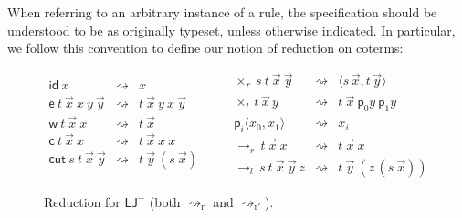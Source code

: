\documentclass[10pt,a4paper]{amsart}
\theoremstyle{plain}
\theoremstyle{definition}
\newcommand{\anupam}[1]{\todo[color=green]{A: #1}}
\renewcommand{\todo}[1]{}
\renewcommand{\anupam}[1]{}
\theoremstyle{plain}
\theoremstyle{definition} %
\newcommand{\sem}[1]{\llbracket {#1} \rrbracket}
\newcommand{\nat}{\mathit{N}}
\newcommand{\N}{\nat} %
\newcommand{\unit}{1}
\newcommand{\arrow}{\to}
\newcommand{\imp}{\arrow} %
\newcommand{\inj}{\mathsf{in}}
\newcommand{\id}{\mathsf{id}}
\newcommand{\ax}{\id}
\newcommand{\ex}{\mathsf{e}}
\newcommand{\cut}{\mathsf{cut}}
\newcommand{\wk}{\mathsf{w}}
\newcommand{\contr}{\mathsf{c}}
\newcommand{\pair}[2]{\langle #1,#2\rangle}
\newcommand{\lr}[1]{#1_l}
\newcommand{\rr}[1]{#1_r}
\newcommand{\LJ}{\mathsf{LJ}}
\newcommand{\LJneg}{\LJ^-}
\newcommand{\proj}[1]{\mathsf{p}_{#1}}
\newcommand{\rewrite}{\rightsquigarrow}
\newcommand{\reduction}{\mathrm{r}}
\newcommand{\reduces}{\rewrite_{\reduction}}
\newcommand{\reductionnorec}{\mathrm{r}'}
\newcommand{\reducesnorec}{\rewrite_{\reductionnorec}}
\newcommand{\betae}{=_{\beta}}
\begin{document}
\todo{explain why we factor the $\times$ interactions (and even $\mu$ too) through other constants/gadgets: $\times$ to facilitate totality argument, and $\mu$ for similarity/to slightly facilitate realisability (though not really since we need bespoke iterators there).}
\todo{explain that we don't include $\inj$ for $\N$ to avoid $+$, instead this is hardcoded into the rules}
\anupam{recall that, apart from in, the actual types are not important due to untypedness.}

When referring to an arbitrary instance of a rule, the specification should be understood to be as originally typeset, unless otherwise indicated.
In particular, we follow this convention to define our notion of reduction on coterms:


\begin{figure}
    \centering
\[
\begin{array}{rcl}
  \ax \  x   &\rewrite  & x \\
\ex \ t \ \vec x \ x \ y \ \vec y&\rewrite& t\  \vec x  \ y \ x \ \vec y  \\
\wk \ t \  \vec x\  x     & \rewrite & t\  \vec x\\
\contr \ t \ \vec x\ x &\rewrite&  t \ \vec x \ x \ x \\
\cut \ s \ t \ \vec x\ \vec y &\rewrite& t \ \vec y \ (s \ \vec x)
\end{array}
\qquad
\begin{array}{rcl}
     {\rr \times \ s \ t \ \vec x \ \vec y }&\rewrite& \pair {  s\, \vec x}{t\,  \vec  y}
\\
 \lr \times \ t \, \vec x  \,y & \rewrite &  t\ \vec x \ \proj 0 y\ \proj 1 y 
 \\
 \proj i \pair {x_0} {x_1} & \rewrite & x_i \\
 \rr \imp \, t  \ \vec x \ x  &\rewrite&  t  \ \vec x \ x \\ 
\lr \imp \, s \ t  \ \vec x\ \vec y \ z  &\rewrite& t \ \vec y \ (z  \, (s \ \vec x )) 
\end{array}
\]
    \caption{Reduction for $\LJneg$ (both $\reduces$ and $\reducesnorec$). }
    \label{fig:reduction-ljneg}
\end{figure}
\end{document}
